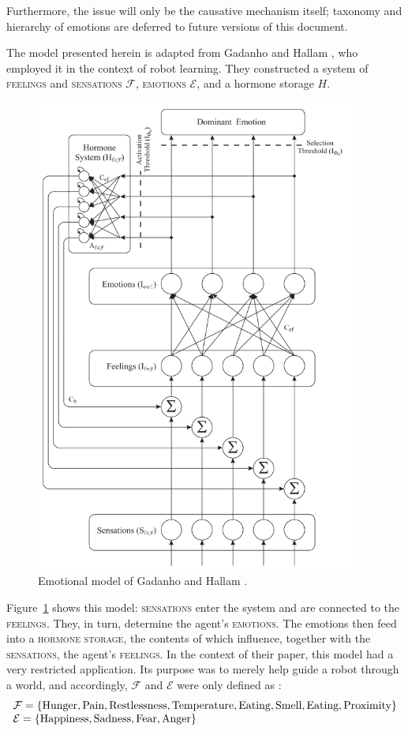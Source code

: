 \documentclass[]{scrartcl}
\newcommand{\mt}[1]{\textnormal{#1}}
\newcommand{\caps}[1]{\textsc{#1}}
\begin{document}
Furthermore, the issue will only be the causative mechanism itself; taxonomy and hierarchy of emotions are deferred to future versions of this document.

The model presented herein is adapted from Gadanho and Hallam \cite{DBLP:journals/adb/GadanhoH01}, who employed it in the context of robot learning. They constructed a system of \caps{feelings} and \caps{sensations} $\mathcal{F}$, \caps{emotions} $\mathcal{E}$, and a hormone storage $H$.

\begin{figure}[!h]
	\centering
	\includegraphics[width=300pt]{figs/gadanhoModel.png}
	\caption{Emotional model of Gadanho and Hallam \cite[p. 46]{DBLP:journals/adb/GadanhoH01}.}
	\label{fig:gadanhoModel}
\end{figure}

Figure~\ref{fig:gadanhoModel} shows this model: \caps{sensations} enter the system and are connected to the \caps{feelings}. They, in turn, determine the agent's \caps{emotions}. The emotions then feed into a \caps{hormone storage}, the contents of which influence, together with the \caps{sensations}, the agent's \caps{feelings}. In the context of their paper, this model had a very restricted application. Its purpose was to merely help guide a robot through a world, and accordingly, $\mathcal{F}$ and $\mathcal{E}$ were only defined as \cite[p. 47]{DBLP:journals/adb/GadanhoH01}:
$$
	\begin{array}{l}
		\mathcal{F} = \{ \mt{Hunger}, \mt{Pain}, \mt{Restlessness},
						 \mt{Temperature}, \mt{Eating}, \mt{Smell},
						 \mt{Eating}, \mt{Proximity} \}\\
		\mathcal{E} = \{ \mt{Happiness}, \mt{Sadness}, \mt{Fear},
						 \mt{Anger} \}
	\end{array}
$$
\end{document}

